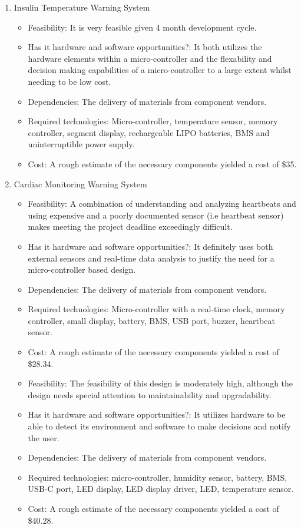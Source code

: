 \begin{enumerate}
  \item Insulin Temperature Warning System
        \begin{itemize}
          \item Feasibility: It is very feasible given 4 month development cycle.
          \item Has it hardware and software opportunities?: It both utilizes the hardware elements within a micro-controller and the flexability and decision making capabilities of a micro-controller to a large extent whilst needing to be low cost.
          \item Dependencies: The delivery of materials from component vendors.
          \item Required technologies: Micro-controller, temperature sensor, memory controller, segment display, rechargeable LIPO batteries, BMS and uninterruptible power supply.
          \item Cost: A rough estimate of the necessary components yielded a cost of \$35.
        \end{itemize}
        \item Cardiac Monitoring Warning System
        \begin{itemize}
          \item Feasibility: A combination of understanding and analyzing heartbeats and using expensive and a poorly documented sensor (i.e heartbeat sensor) makes meeting the project deadline exceedingly difficult.
          \item Has it hardware and software opportunities?: It definitely uses both external sensors and real-time data analysis to justify the need for a micro-controller based design.
          \item Dependencies: The delivery of materials from component vendors.
          \item Required technologies: Micro-controller with a real-time clock, memory controller, small display, battery, BMS, USB port, buzzer, heartbeat sensor.
          \item Cost: A rough estimate of the necessary components yielded a cost of \$28.34.
        \end{itemize}
        \begin{itemize}
          \item Feasibility: The feasibility of this design is moderately high, although the design needs special attention to maintainability and upgradability.
          \item Has it hardware and software opportunities?: It utilizes hardware to be able to detect its environment and software to make decisions and notify the user.
          \item Dependencies: The delivery of materials from component vendors.
          \item Required technologies: micro-controller, humidity sensor, battery, BMS, USB-C port, LED display, LED display driver, LED, temperature sensor.
          \item Cost: A rough estimate of the necessary components yielded a cost of \$40.28.
        \end{itemize}
\end{enumerate}
